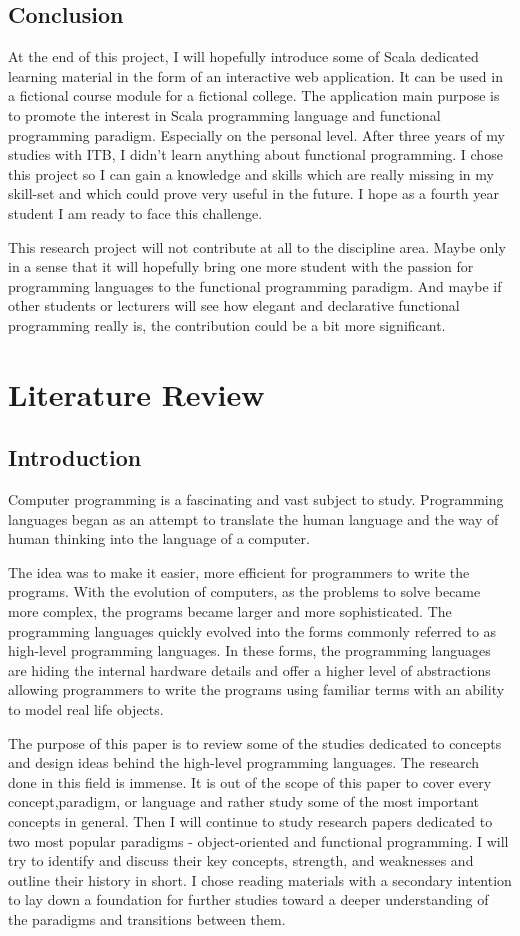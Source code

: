 \documentclass[12pt,twoside,a4paper]{report}
\begin{document}
\section{Conclusion}
At the end of this project, I will hopefully introduce some of Scala dedicated learning material in the form of an interactive web application. It can be used in a fictional course module for a fictional college. The application main purpose is to promote the interest in Scala programming language and functional programming paradigm. Especially on the personal level. After three years of my studies with ITB, I didn't learn anything about functional programming. I chose this project so I can gain a knowledge and skills which are really missing in my skill-set and which could prove very useful in the future. I hope as a fourth year student I am ready to face this challenge.\par
This research project will not contribute at all to the discipline area. Maybe only in a sense that it will hopefully bring one more student with the passion for programming languages to the functional programming paradigm. And maybe if other students or lecturers will see how elegant and declarative functional programming really is, the contribution could be a bit more significant.

\chapter{Literature Review}
\section{Introduction}
Computer programming is a fascinating and vast subject to study. Programming languages began as
an attempt to translate the human language and the way of human thinking into the language of a
computer.

The idea was to make it easier, more efficient for programmers to write the programs. With the evolution of computers, as the problems to solve became more complex, the programs became larger and more sophisticated. The programming languages quickly evolved into the forms commonly referred to as high-level programming languages. In these forms, the programming languages are hiding the internal hardware details and offer a higher level of abstractions allowing programmers to write the programs using familiar terms with an ability to model real life objects.

The purpose of this paper is to review some of the studies dedicated to concepts and design ideas behind the high-level programming languages. The research done in this field is immense. It is out of the scope of this paper to cover every concept,paradigm, or language and rather study some of the most important concepts in general. Then I will continue to study research papers dedicated to two most popular paradigms - object-oriented and functional programming. I will try to identify and discuss their key concepts, strength, and weaknesses and outline their history in short. I chose reading materials with a secondary intention to lay down a foundation for further studies toward a deeper understanding of the paradigms and transitions between them.
\end{document}
